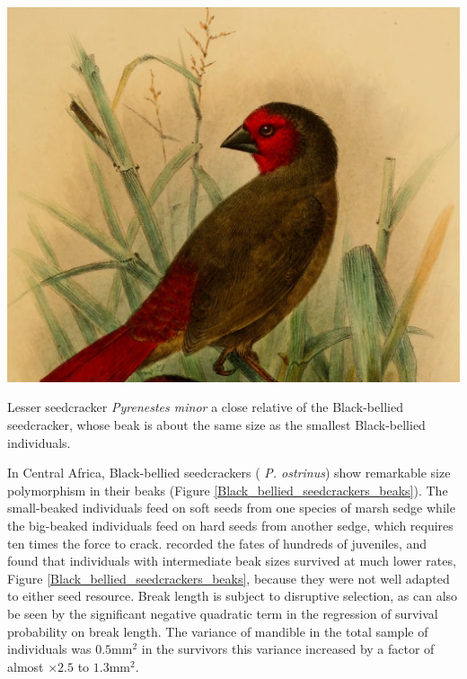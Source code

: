 
\begin{marginfigure}
\begin{center}
\includegraphics[width= \textwidth]{illustration_images/Quant_gen/Pyrenestes_seedcracker/Pyrenestes_minor.jpg}
\end{center}
\caption{Lesser seedcracker {\it Pyrenestes minor} a close relative of
  the Black-bellied seedcracker, whose beak is about the same size as
  the smallest Black-bellied individuals.  }  
\end{marginfigure}
In Central Africa, Black-bellied seedcrackers ({\it
  P. ostrinus}) show remarkable size polymorphism in their
beaks (Figure \ref{Black_bellied_seedcrackers_beaks}).  The small-beaked individuals feed on
soft  seeds from one species of marsh sedge while the big-beaked
individuals feed on hard seeds from another sedge, which
requires ten times the force to crack.  \citet{smith1993disruptive}
recorded the fates of hundreds of juveniles, and found that
individuals with intermediate beak sizes survived at much lower rates,
Figure \ref{Black_bellied_seedcrackers_beaks}, because they were not
well adapted to either seed resource.  Break length is subject to
disruptive selection, as can also be seen by the significant negative quadratic
term in the regression of survival probability on break length. The variance of mandible in the total sample of individuals was
$0.5$mm$^2$ in the survivors this variance increased by a factor of
almost $\times 2.5$ to $1.3$mm$^2$.  

